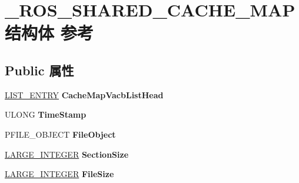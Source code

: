 \hypertarget{struct___r_o_s___s_h_a_r_e_d___c_a_c_h_e___m_a_p}{}\section{\+\_\+\+R\+O\+S\+\_\+\+S\+H\+A\+R\+E\+D\+\_\+\+C\+A\+C\+H\+E\+\_\+\+M\+A\+P结构体 参考}
\label{struct___r_o_s___s_h_a_r_e_d___c_a_c_h_e___m_a_p}
\subsection*{Public 属性}
\begin{DoxyCompactItemize}
\item 
\mbox{\label{struct___r_o_s___s_h_a_r_e_d___c_a_c_h_e___m_a_p_a0c6aa69a4c131bb28bcde35dd9f36f7b}} 
\hyperlink{struct___l_i_s_t___e_n_t_r_y}{L\+I\+S\+T\+\_\+\+E\+N\+T\+RY} {\bfseries Cache\+Map\+Vacb\+List\+Head}
\item 
\mbox{\label{struct___r_o_s___s_h_a_r_e_d___c_a_c_h_e___m_a_p_a120c992d233bf5736843b66aa1ae6e13}} 
U\+L\+O\+NG {\bfseries Time\+Stamp}
\item 
\mbox{\label{struct___r_o_s___s_h_a_r_e_d___c_a_c_h_e___m_a_p_ae90f05692a062365253c41a924f06065}} 
P\+F\+I\+L\+E\+\_\+\+O\+B\+J\+E\+CT {\bfseries File\+Object}
\item 
\mbox{\label{struct___r_o_s___s_h_a_r_e_d___c_a_c_h_e___m_a_p_ac38f781715f173870da117b67d571254}} 
\hyperlink{union___l_a_r_g_e___i_n_t_e_g_e_r}{L\+A\+R\+G\+E\+\_\+\+I\+N\+T\+E\+G\+ER} {\bfseries Section\+Size}
\item 
\mbox{\label{struct___r_o_s___s_h_a_r_e_d___c_a_c_h_e___m_a_p_a0e872c0711d1dd547e4223a4c4062dd7}} 
\hyperlink{union___l_a_r_g_e___i_n_t_e_g_e_r}{L\+A\+R\+G\+E\+\_\+\+I\+N\+T\+E\+G\+ER} {\bfseries File\+Size}
\item 
\mbox{\label{struct___r_o_s___s_h_a_r_e_d___c_a_c_h_e___m_a_p_ace24a55503f98d8266d4eb2b79995ba4}} 

\end{DoxyCompactItemize}
